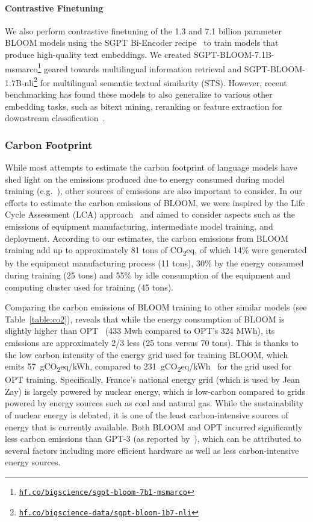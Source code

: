 \paragraph{Contrastive Finetuning} We also perform contrastive finetuning of the 1.3 and 7.1 billion parameter BLOOM models using the SGPT Bi-Encoder recipe~\citep{muennighoff2022sgpt} to train models that produce high-quality text embeddings. We created SGPT-BLOOM-7.1B-msmarco\footnote{\href{https://hf.co/bigscience/sgpt-bloom-7b1-msmarco}{\texttt{hf.co/bigscience/sgpt-bloom-7b1-msmarco}}} geared towards multilingual information retrieval and SGPT-BLOOM-1.7B-nli\footnote{\href{https://hf.co/bigscience-data/sgpt-bloom-1b7-nli}{\texttt{hf.co/bigscience-data/sgpt-bloom-1b7-nli}}} for multilingual semantic textual similarity (STS). However, recent benchmarking has found these models to also generalize to various other embedding tasks, such as bitext mining, reranking or feature extraction for downstream classification~\citep{muennighoff2022mteb}.

\subsubsection{Carbon Footprint}

While most attempts to estimate the carbon footprint of language models have shed light on the emissions produced due to energy consumed during model training (e.g.~\citealp{patterson2021carbon, strubell2019energy}), other sources of emissions are also important to consider. In our efforts to estimate the carbon emissions of BLOOM, we were inspired by the Life Cycle Assessment (LCA) approach~\citep{klopffer1997life} and aimed to consider aspects such as the emissions of equipment manufacturing, intermediate model training, and deployment. According to our estimates, the carbon emissions from BLOOM training add up to approximately 81 tons of CO\textsubscript{2}eq, of which 14\% were generated by the equipment manufacturing process (11 tons), 30\% by the energy consumed during training (25 tons) and 55\% by idle consumption of the equipment and computing cluster used for training (45 tons). 

Comparing the carbon emissions of BLOOM training to other similar models (see Table~\ref{table:co2}), reveals that while the energy consumption of BLOOM is slightly higher than OPT~\citep{zhang2022opt} (433 Mwh compared to OPT's 324 MWh), its emissions are approximately 2/3 less (25 tons versus 70 tons). This is thanks to the low carbon intensity of the energy grid used for training BLOOM, which emits 57~gCO\textsubscript{2}eq/kWh, compared to 231~gCO\textsubscript{2}eq/kWh~ for the grid used for OPT training. Specifically, France's national energy grid (which is used by Jean Zay) is largely powered by nuclear energy, which is low-carbon compared to grids powered by energy sources such as coal and natural gas. While the sustainability of nuclear energy is debated, it is one of the least carbon-intensive sources of energy that is currently available. Both BLOOM and OPT incurred significantly less carbon emissions than GPT-3 (as reported by~\citep{patterson2021carbon}), which can be attributed to several factors including more efficient hardware as well as less carbon-intensive energy sources.

